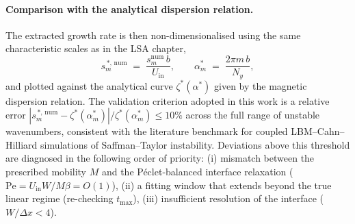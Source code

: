 \paragraph{Comparison with the analytical dispersion relation.}
The extracted growth rate is then non-dimensionalised using the same characteristic scales as in the LSA chapter,
\begin{equation}
s_m^{\,*,\,\mathrm{num}} \;=\; \frac{s_m^{\mathrm{num}}\,b}{U_{\mathrm{in}}},
\qquad
\alpha^{*}_m \;=\; \frac{2\pi m\,b}{N_y},
\end{equation}
and plotted against the analytical curve $\zeta^{*}(\alpha^{*})$ given by the magnetic dispersion relation.
The validation criterion adopted in this work is a relative error $|s_m^{\,*,\,\mathrm{num}} - \zeta^{*}(\alpha_m^{*})|/\zeta^{*}(\alpha_m^{*}) \le 10\%$ across the full range of unstable wavenumbers, consistent with the literature benchmark for coupled LBM--Cahn--Hilliard simulations of Saffman--Taylor instability.
Deviations above this threshold are diagnosed in the following order of priority: (i) mismatch between the prescribed mobility $M$ and the P\'eclet-balanced interface relaxation ($\mathrm{Pe} = U_{\mathrm{in}}W/M\beta = O(1)$), (ii) a fitting window that extends beyond the true linear regime (re-checking $t_{\max}$), (iii) insufficient resolution of the interface ($W/\Delta x < 4$).

